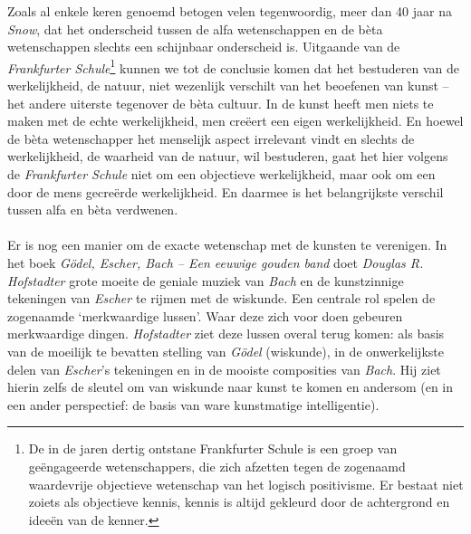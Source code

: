Zoals al enkele keren genoemd betogen velen tegenwoordig, meer dan 40 jaar na \emph{Snow}, dat het onderscheid tussen de alfa wetenschappen en de b\`eta wetenschappen slechts een schijnbaar onderscheid is. Uitgaande van de \emph{Frankfurter Schule}\footnote{De in de jaren dertig ontstane Frankfurter Schule is een groep van ge\"engageerde wetenschappers, die zich afzetten tegen de zogenaamd waardevrije objectieve wetenschap van het logisch positivisme. Er bestaat niet zoiets als objectieve kennis, kennis is altijd gekleurd door de achtergrond en idee\"en van de kenner.} kunnen we tot de conclusie komen dat het bestuderen van de werkelijkheid, de natuur, niet wezenlijk verschilt van het beoefenen van kunst -- het andere uiterste tegenover de b\`eta cultuur. In de kunst heeft men niets te maken met de echte werkelijkheid, men cre\"eert een eigen werkelijkheid. En hoewel de b\`eta wetenschapper het menselijk aspect irrelevant vindt en slechts de werkelijkheid, de waarheid van de natuur, wil bestuderen, gaat het hier volgens de \emph{Frankfurter Schule} niet om een objectieve werkelijkheid, maar ook om een door de mens gecre\"erde werkelijkheid. En daarmee is het belangrijkste verschil tussen alfa en b\`eta verdwenen.

\paragraph{}

Er is nog een manier om de exacte wetenschap met de kunsten te verenigen. In het boek \emph{G\"odel, Escher, Bach -- Een eeuwige gouden band}\cite{Hofstadter} doet \emph{Douglas R. Hofstadter} grote moeite de geniale muziek van \emph{Bach} en de kunstzinnige tekeningen van \emph{Escher} te rijmen met de wiskunde. Een centrale rol spelen de zogenaamde `merkwaardige lussen'. Waar deze zich voor doen gebeuren merkwaardige dingen. \emph{Hofstadter} ziet deze lussen overal terug komen: als basis van de moeilijk te bevatten stelling van \emph{G\"odel} (wiskunde), in de onwerkelijkste delen van \emph{Escher}'s tekeningen en in de mooiste composities van \emph{Bach}. Hij ziet hierin zelfs de sleutel om van wiskunde naar kunst te komen en andersom (en in een ander perspectief: de basis van ware kunstmatige intelligentie).

